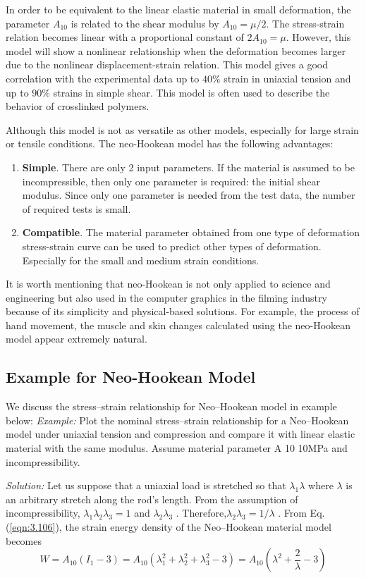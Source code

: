 In order to be equivalent to the linear elastic material in small deformation, the parameter $ A_{10} $ is related to the shear modulus by $ A_{10}=\mu / 2 $. The stress-strain relation becomes linear with a proportional constant of $ 2 A_{10}=\mu $. However, this model will show a nonlinear relationship when the deformation becomes larger due to the nonlinear displacement-strain relation. This model gives a good correlation with the experimental data up to $ 40 \% $ strain in uniaxial tension and up to $ 90 \% $ strains in simple shear. This model is often used to describe the behavior of crosslinked polymers.

Although this model is not as versatile as other models, especially for large strain or tensile conditions. The neo-Hookean model has the following advantages:
\begin{enumerate}
    \item  \textbf{Simple}. There are only 2 input parameters. If the material is assumed to be incompressible, then only one parameter is required: the initial shear modulus. Since only one parameter is needed from the test data, the number of required tests is small.
    \item \textbf{Compatible}. The material parameter obtained from one type of deformation stress-strain curve can be used to predict other types of deformation. Especially for the small and medium strain conditions.
\end{enumerate}

It is worth mentioning that neo-Hookean is not only applied to science and engineering but also used in the computer graphics in the filming industry because of its simplicity and physical-based solutions. For example, the process of hand movement, the muscle and skin changes calculated using the neo-Hookean model appear extremely natural.

\subsection{Example for Neo-Hookean Model}
We discuss the stress–strain relationship for Neo–Hookean model in example below:
\textit{Example:} Plot the nominal stress–strain relationship for a Neo–Hookean model under uniaxial tension and
compression and compare it with linear elastic material with the same modulus.
Assume material parameter A 10  10MPa and incompressibility.

\textit{Solution:} Let us suppose that a uniaxial load is stretched so that $\lambda_ 1  \lambda$ where $ \lambda $ is an
arbitrary stretch along the rod’s length. From the assumption of incompressibility,
$\lambda_ 1 \lambda _2 \lambda_ 3  =1 $ and $ \lambda_ 2  \lambda_3$ . Therefore,$ \lambda_ 2  \lambda _3  =1/ \lambda$ . From Eq. (\ref{eqn:3.106}), the strain energy density of the Neo–Hookean material model becomes
\begin{equation*}
 W=A_{10}\left(I_{1}-3\right)=A_{10}\left(\lambda_{1}^{2}+\lambda_{2}^{2}+\lambda_{3}^{2}-3\right)=A_{10}\left(\lambda^{2}+\frac{2}{\lambda}-3\right) 
\end{equation*}